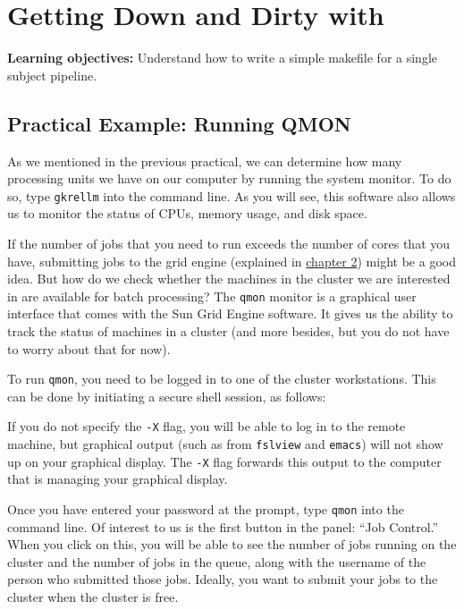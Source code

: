 \chapter{Getting Down and Dirty with \maken{}}
\label{sec:practicum3}

\textbf{Learning objectives:} Understand how to write a simple makefile for a single subject pipeline.

\section{Practical Example: Running QMON}
As we mentioned in the previous practical, we can determine how many processing units we have on our computer by running the system monitor. To do so, type \texttt{gkrellm} into the command line.  As you will see, this software also allows us to monitor the status of CPUs, memory usage, and disk space. 

If the number of jobs that you need to run exceeds the number of cores that you have, submitting jobs to the grid engine (explained in \hyperref[sec:gridengine]{chapter 2}) might be a good idea. But how do we check whether the machines in the cluster we are interested in are available for batch processing? The \texttt{qmon} monitor is a graphical user interface that comes with the Sun Grid Engine software. It gives us the ability to track the status of machines in a cluster (and more besides, but you do not have to worry about that for now). 

To run \texttt{qmon}, you need to be logged in to one of the cluster workstations. This can be done by initiating a secure shell session, as follows:

If you do not specify the \texttt{-X} flag, you will be able to log in to the remote machine, but graphical output (such as from \texttt{fslview} and \texttt{emacs}) will not show up on your graphical display. The \texttt{-X} flag forwards this output to the computer that is managing your graphical display. 

Once you have entered your password at the prompt, type \texttt{qmon} into the command line. Of interest to us is the first button in the panel: ``Job Control.'' When you click on this, you will be able to see the number of jobs running on the cluster and the number of jobs in the queue, along with the username of the person who submitted those jobs. Ideally, you want to submit your jobs to the cluster when the cluster is free. 

